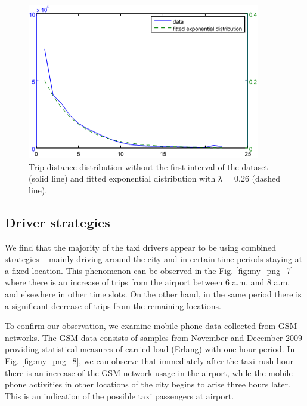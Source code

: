 \documentclass[a4paper, 10pt, conference]{ieeeconf}      %
\begin{document}
\begin{figure}[ht]
    \centering
    \includegraphics{fig/png6.png}
    \caption{Trip distance distribution without the first interval of the dataset (solid line) and fitted exponential distribution with λ = 0.26 (dashed line).}
    \label{fig:my_png_6}
\end{figure}

\subsection{Driver strategies} We find that the majority of the taxi drivers appear to be using combined strategies – mainly driving around the city and in certain time periods staying at a fixed location. This phenomenon can be observed in the Fig. \ref{fig:my_png_7} where there is an increase of trips from the airport between 6 a.m. and 8 a.m. and elsewhere in other time slots. On the other hand, in the same period there is a significant decrease of trips from the remaining locations.  


To confirm our observation, we examine mobile phone data collected from GSM networks. The GSM data consists of samples from November and December 2009 providing statistical measures of carried load (Erlang) with one-hour period. In Fig. \ref{fig:my_png_8}, we can observe that immediately after the taxi rush hour there is an increase of the GSM network usage in the airport, while the mobile phone activities in other locations of the city begins to arise three hours later. This is an indication of the possible taxi passengers at airport. 
\end{document}
